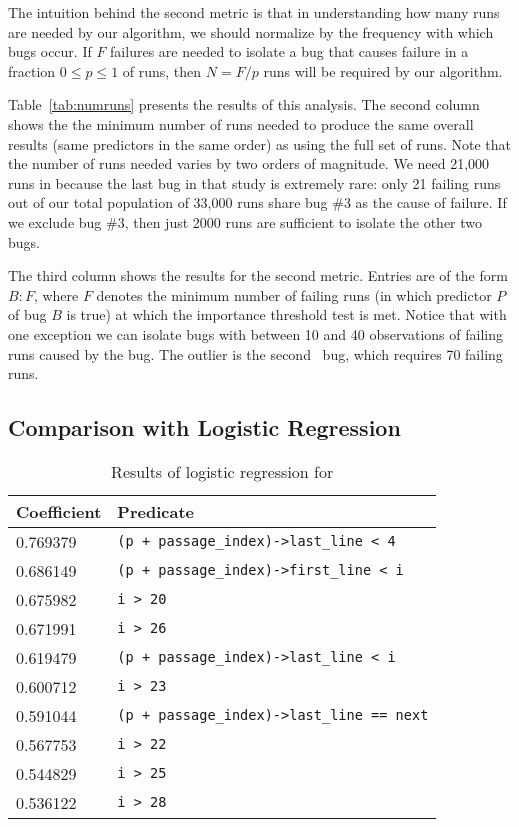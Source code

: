 The intuition behind the second metric is that in understanding how
many runs are needed by our algorithm, we should normalize by the
frequency with which bugs occur.  If $F$ failures are needed to
isolate a bug that causes failure in a fraction $0 \leq p \leq 1$ of
runs, then $N = F/p$ runs will be required by our
algorithm.

Table~\ref{tab:numruns} presents the results of this analysis.  The
second column shows the the minimum number of runs needed to produce
the same overall results (same predictors in the same order) as using
the full set of runs.  Note that the number of runs needed varies by
two orders of magnitude.  We need 21,000 runs in \exif
because the last bug in that study is extremely rare: only
21 failing runs out of our total population of 33,000 runs share bug
\#3 as the cause of failure.  If we exclude bug \#3, then just 2000
runs are sufficient to isolate the other two bugs.

The third column shows the results for the second metric.
Entries are of the form $B : F$, where $F$ denotes
the minimum number of failing runs (in which predictor $P$ of bug $B$ is true)
at which the importance threshold test is met.
Notice that with one exception we can isolate bugs with between 10 and 40 
observations of failing runs caused by the bug.  The outlier is the second
\rhythmbox\ bug, which requires 70 failing runs.


\subsection{Comparison with Logistic Regression}
\label{sec:comparison}

\begin{table}
\nocaptionrule
\caption{Results of logistic regression for \moss}
\label{tab:logregression}
\centering
\scriptsize
\begin{tabular}{ll}
  \toprule
  Coefficient & Predicate \\
  \midrule
  0.769379 & \verb|(p + passage_index)->last_line < 4| \\
  0.686149 & \verb|(p + passage_index)->first_line < i| \\
  0.675982 & \verb|i > 20| \\
  0.671991 & \verb|i > 26| \\
  0.619479 & \verb|(p + passage_index)->last_line < i| \\
  0.600712 & \verb|i > 23| \\
  0.591044 & \verb|(p + passage_index)->last_line == next| \\
  0.567753 & \verb|i > 22| \\
  0.544829 & \verb|i > 25| \\
  0.536122 & \verb|i > 28| \\
  \bottomrule
\end{tabular}
\end{table}


